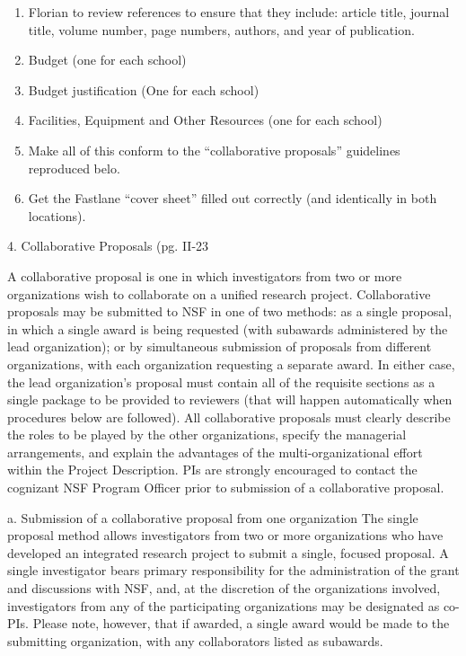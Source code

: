 \documentclass[pdftex,12pt,fullpage,oneside]{amsart}
\begin{document}
\begin{enumerate}
\item Florian to review references to ensure that they include: article title,
  journal title, volume number, page numbers, authors, and year of
  publication.  
\item Budget (one for each school)
\item Budget justification (One for each school)
\item Facilities, Equipment and Other Resources (one for each school)
\item Make all of this conform to the ``collaborative proposals''
  guidelines reproduced belo.
\item Get the Fastlane ``cover sheet'' filled out correctly (and identically in
  both locations).
\end{enumerate}



4. Collaborative Proposals  (pg. II-23

A collaborative proposal is one in which investigators from two or
more organizations wish to collaborate on a unified research project.
Collaborative proposals may be submitted to NSF in one of two methods:
as a single proposal, in which a single award is being requested (with
subawards administered by the lead organization); or by simultaneous
submission of proposals from different organizations, with each
organization requesting a separate award.  In either case, the lead
organization’s proposal must contain all of the requisite sections as
a single package to be provided to reviewers (that will happen
automatically when procedures below are followed).  All collaborative
proposals must clearly describe the roles to be played by the other
organizations, specify the managerial arrangements, and explain the
advantages of the multi-organizational effort within the Project
Description.  PIs are strongly encouraged to contact the cognizant NSF
Program Officer prior to submission of a collaborative proposal.

a. Submission of a collaborative proposal from one organization The
single proposal method allows investigators from two or more
organizations who have developed an integrated research project to
submit a single, focused proposal.  A single investigator bears
primary responsibility for the administration of the grant and
discussions with NSF, and, at the discretion of the organizations
involved, investigators from any of the participating organizations
may be designated as co-PIs.  Please note, however, that if awarded, a
single award would be made to the submitting organization, with any
collaborators listed as subawards.
\end{document}
